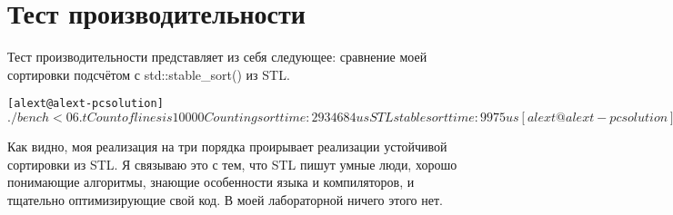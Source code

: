 \section{Тест производительности}
Тест производительности представляет из себя следующее: сравнение моей сортировки подсчётом с std::stable\_sort() из STL.
\begin{alltt}
[alext@alext-pc solution]$ ./bench < 06.t
Count of lines is 10000
Counting sort time: 2934684us
STL stable sort time: 9975us
[alext@alext-pc solution]$ 
\end{alltt}

Как видно, моя реализация на три порядка проирывает реализации устойчивой сортировки из STL. Я связываю это с тем, что STL пишут умные люди, хорошо понимающие алгоритмы, знающие особенности языка и компиляторов, и тщательно оптимизирующие свой код. В моей лабораторной ничего этого нет.

\pagebreak